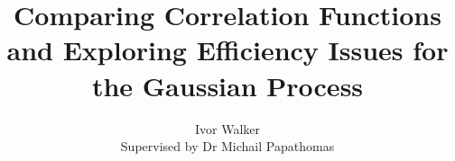 \documentclass[10pt]{article}
\begin{document}
\title{Comparing Correlation Functions and Exploring Efficiency Issues for the Gaussian Process}
\author{
    Ivor Walker \\
    Supervised by Dr Michail Papathomas \\
}
\date{ }
\maketitle



\newpage
\tableofcontents
\newpage











% 




\printbibliography
\end{document}
